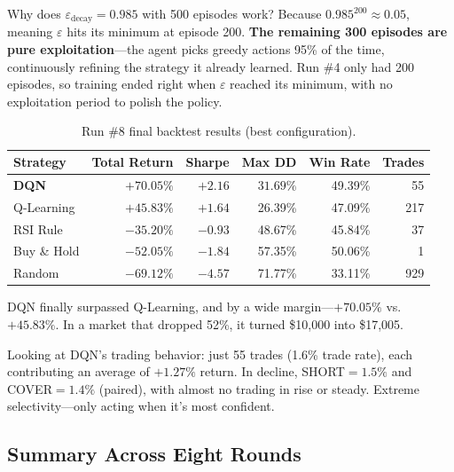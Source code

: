 \documentclass[11pt,a4paper]{article}
\begin{document}
Why does $\varepsilon_{\text{decay}}=0.985$ with 500 episodes work? Because $0.985^{200} \approx 0.05$, meaning $\varepsilon$ hits its minimum at episode 200. \textbf{The remaining 300 episodes are pure exploitation}---the agent picks greedy actions 95\% of the time, continuously refining the strategy it already learned. Run \#4 only had 200 episodes, so training ended right when $\varepsilon$ reached its minimum, with no exploitation period to polish the policy.

\begin{table}[H]
\centering
\caption{Run \#8 final backtest results (best configuration).}
\label{tab:run8}
\begin{tabular}{lrrrrr}
\toprule
Strategy & Total Return & Sharpe & Max DD & Win Rate & Trades \\
\midrule
\textbf{DQN} & $\mathbf{+70.05\%}$ & $\mathbf{+2.16}$ & $\mathbf{31.69\%}$ & 49.39\% & 55 \\
Q-Learning   & $+45.83\%$ & $+1.64$ & 26.39\% & 47.09\% & 217 \\
RSI Rule     & $-35.20\%$ & $-0.93$ & 48.67\% & 45.84\% & 37 \\
Buy \& Hold  & $-52.05\%$ & $-1.84$ & 57.35\% & 50.06\% & 1 \\
Random       & $-69.12\%$ & $-4.57$ & 71.77\% & 33.11\% & 929 \\
\bottomrule
\end{tabular}
\end{table}

DQN finally surpassed Q-Learning, and by a wide margin---$+70.05\%$ vs.\ $+45.83\%$. In a market that dropped 52\%, it turned \$10,000 into \$17,005.

Looking at DQN's trading behavior: just 55 trades (1.6\% trade rate), each contributing an average of $+1.27\%$ return. In decline, SHORT$=1.5\%$ and COVER$=1.4\%$ (paired), with almost no trading in rise or steady. Extreme selectivity---only acting when it's most confident.

\subsection{Summary Across Eight Rounds}
\end{document}
